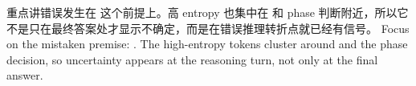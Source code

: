 {}\markdownRendererInterblockSeparator
{}\markdownRendererInterblockSeparator
{}重点讲错误发生在  这个前提上。高 entropy 也集中在  和 phase 判断附近，所以它不是只在最终答案处才显示不确定，而是在错误推理转折点就已经有信号。\markdownRendererInterblockSeparator
{}\markdownRendererInterblockSeparator
{}Focus on the mistaken premise: . The high-entropy tokens cluster around  and the phase decision, so uncertainty appears at the reasoning turn, not only at the final answer.\markdownRendererDocumentEnd